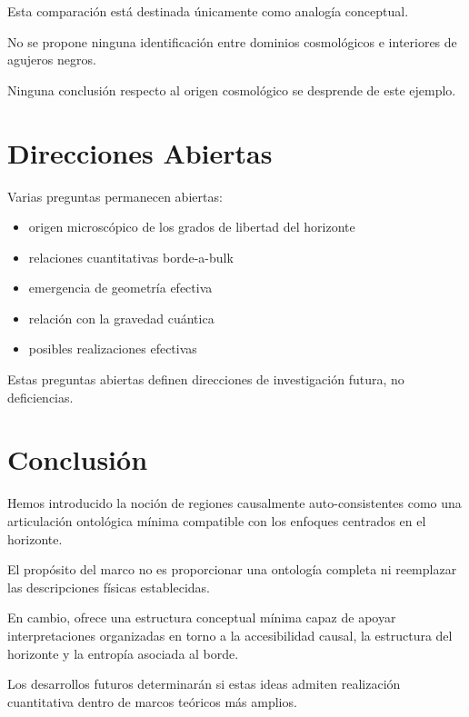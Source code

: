 \documentclass[12pt,a4paper]{article}
\begin{document}
Esta comparación está destinada únicamente como analogía conceptual.

No se propone ninguna identificación entre dominios cosmológicos e interiores de agujeros negros.

Ninguna conclusión respecto al origen cosmológico se desprende de este ejemplo.

\section{Direcciones Abiertas}

Varias preguntas permanecen abiertas:

\begin{itemize}
  \item origen microscópico de los grados de libertad del horizonte
  \item relaciones cuantitativas borde-a-bulk
  \item emergencia de geometría efectiva
  \item relación con la gravedad cuántica
  \item posibles realizaciones efectivas
\end{itemize}

Estas preguntas abiertas definen direcciones de investigación futura, no deficiencias.

\section{Conclusión}

Hemos introducido la noción de regiones causalmente auto-consistentes como una articulación ontológica mínima compatible con los enfoques centrados en el horizonte.

El propósito del marco no es proporcionar una ontología completa ni reemplazar las descripciones físicas establecidas.

En cambio, ofrece una estructura conceptual mínima capaz de apoyar interpretaciones organizadas en torno a la accesibilidad causal, la estructura del horizonte y la entropía asociada al borde.

Los desarrollos futuros determinarán si estas ideas admiten realización cuantitativa dentro de marcos teóricos más amplios.
\end{document}
